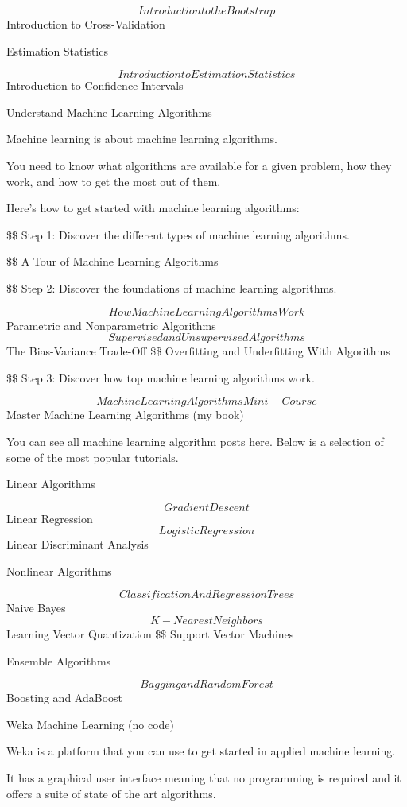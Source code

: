 \documentclass[11pt]{article}
\begin{document}
$$ Introduction to the Bootstrap
$$ Introduction to Cross-Validation

Estimation Statistics

$$ Introduction to Estimation Statistics
$$ Introduction to Confidence Intervals

Understand Machine Learning Algorithms

Machine learning is about machine learning algorithms.

You need to know what algorithms are available for a given problem, how they work, and how to get the most out of them.

Here’s how to get started with machine learning algorithms:

\$\$ Step 1: Discover the different types of machine learning algorithms. 

\$\$ A Tour of Machine Learning Algorithms

\$\$ Step 2: Discover the foundations of machine learning algorithms. 

$$ How Machine Learning Algorithms Work
 $$ Parametric and Nonparametric Algorithms
$$ Supervised and Unsupervised Algorithms
 $$ The Bias-Variance Trade-Off
\$\$ Overfitting and Underfitting With Algorithms

\$\$ Step 3: Discover how top machine learning algorithms work. 

$$ Machine Learning Algorithms Mini-Course
 $$ Master Machine Learning Algorithms (my book)

You can see all machine learning algorithm posts here. Below is a selection of some of the most popular tutorials.

Linear Algorithms

$$ Gradient Descent
$$ Linear Regression
$$ Logistic Regression
$$ Linear Discriminant Analysis

Nonlinear Algorithms

$$ Classification And Regression Trees
$$ Naive Bayes
$$ K-Nearest Neighbors
$$ Learning Vector Quantization
\$\$ Support Vector Machines

Ensemble Algorithms

$$ Bagging and Random Forest
$$ Boosting and AdaBoost

Weka Machine Learning (no code)

Weka is a platform that you can use to get started in applied machine learning.

It has a graphical user interface meaning that no programming is required and it offers a suite of state of the art algorithms.
\end{document}
